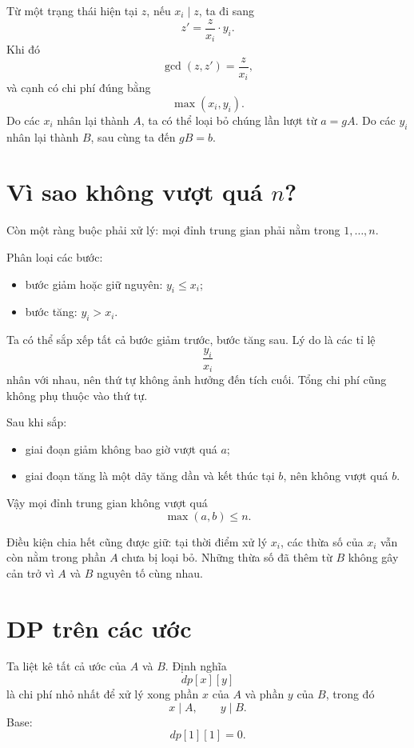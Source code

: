 \documentclass[11pt,a4paper]{article}
\begin{document}
Từ một trạng thái hiện tại \(z\), nếu \(x_i\mid z\), ta đi sang
\[
  z'=\frac{z}{x_i}\cdot y_i.
\]
Khi đó
\[
  \gcd(z,z')=\frac{z}{x_i},
\]
và cạnh có chi phí đúng bằng
\[
  \max(x_i,y_i).
\]
Do các \(x_i\) nhân lại thành \(A\), ta có thể loại bỏ chúng lần lượt từ \(a=gA\). Do các \(y_i\) nhân lại thành \(B\), sau cùng ta đến \(gB=b\).

\section{\texorpdfstring{Vì sao không vượt quá \(n\)?}{Vì sao không vượt quá n?}}

Còn một ràng buộc phải xử lý: mọi đỉnh trung gian phải nằm trong \(1,\ldots,n\).

Phân loại các bước:

\begin{itemize}
  \item bước giảm hoặc giữ nguyên: \(y_i\le x_i\);
  \item bước tăng: \(y_i>x_i\).
\end{itemize}

Ta có thể sắp xếp tất cả bước giảm trước, bước tăng sau. Lý do là các tỉ lệ
\[
  \frac{y_i}{x_i}
\]
nhân với nhau, nên thứ tự không ảnh hưởng đến tích cuối. Tổng chi phí cũng không phụ thuộc vào thứ tự.

Sau khi sắp:

\begin{itemize}
  \item giai đoạn giảm không bao giờ vượt quá \(a\);
  \item giai đoạn tăng là một dãy tăng dần và kết thúc tại \(b\), nên không vượt quá \(b\).
\end{itemize}

Vậy mọi đỉnh trung gian không vượt quá
\[
  \max(a,b)\le n.
\]

Điều kiện chia hết cũng được giữ: tại thời điểm xử lý \(x_i\), các thừa số của \(x_i\) vẫn còn nằm trong phần \(A\) chưa bị loại bỏ. Những thừa số đã thêm từ \(B\) không gây cản trở vì \(A\) và \(B\) nguyên tố cùng nhau.

\section{DP trên các ước}

Ta liệt kê tất cả ước của \(A\) và \(B\). Định nghĩa
\[
  dp[x][y]
\]
là chi phí nhỏ nhất để xử lý xong phần \(x\) của \(A\) và phần \(y\) của \(B\), trong đó
\[
  x\mid A,\qquad y\mid B.
\]
Base:
\[
  dp[1][1]=0.
\]
\end{document}
